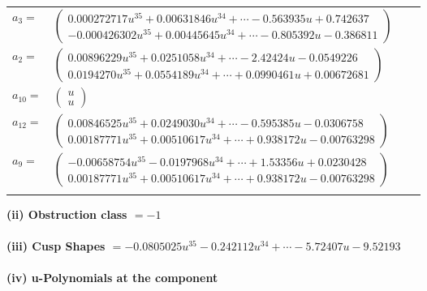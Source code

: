 \documentclass[1p]{elsarticle_modified}
\theoremstyle{definition}
\begin{document}
\begin{tabular}{m{7pt} m{180pt} m{7pt} m{180pt} }
\flushright $a_{3}=$&$\begin{pmatrix}0.000272717 u^{35}+0.00631846 u^{34}+\cdots-0.563935 u+0.742637\\-0.000426302 u^{35}+0.00445645 u^{34}+\cdots-0.805392 u-0.386811\end{pmatrix}$ \\
\flushright $a_{2}=$&$\begin{pmatrix}0.00896229 u^{35}+0.0251058 u^{34}+\cdots-2.42424 u-0.0549226\\0.0194270 u^{35}+0.0554189 u^{34}+\cdots+0.0990461 u+0.00672681\end{pmatrix}$ \\
\flushright $a_{10}=$&$\begin{pmatrix}u\\u\end{pmatrix}$ \\
\flushright $a_{12}=$&$\begin{pmatrix}0.00846525 u^{35}+0.0249030 u^{34}+\cdots-0.595385 u-0.0306758\\0.00187771 u^{35}+0.00510617 u^{34}+\cdots+0.938172 u-0.00763298\end{pmatrix}$ \\
\flushright $a_{9}=$&$\begin{pmatrix}-0.00658754 u^{35}-0.0197968 u^{34}+\cdots+1.53356 u+0.0230428\\0.00187771 u^{35}+0.00510617 u^{34}+\cdots+0.938172 u-0.00763298\end{pmatrix}$\\&\end{tabular}
\flushleft \textbf{(ii) Obstruction class $= -1$}\\~\\
\flushleft \textbf{(iii) Cusp Shapes $= -0.0805025 u^{35}-0.242112 u^{34}+\cdots-5.72407 u-9.52193$}\\~\\
\newpage\renewcommand{\arraystretch}{1}
\flushleft \textbf{(iv) u-Polynomials at the component}\newline \\
\end{document}
